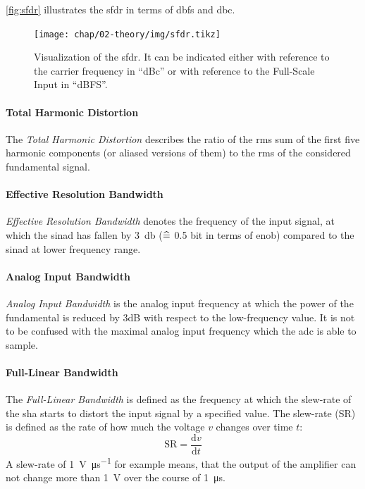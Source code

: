 \autoref{fig:sfdr} illustrates the \gls{sfdr} in terms of \gls{dbfs} and \gls{dbc}.

\begin{figure}[tbh]
	\centering
	\texttt{[image: chap/02-theory/img/sfdr.tikz]}
	\caption[SFDR definition]{Visualization of the \gls{sfdr}. It can be indicated either with reference to the carrier frequency in ``dBc'' or with reference to the Full-Scale Input in ``dBFS''. \cite{walt2009}}
	\label{fig:sfdr}
\end{figure}
\paragraph{Total Harmonic Distortion}
The \textit{Total Harmonic Distortion} describes the ratio of the \gls{rms} sum of the first five harmonic components (or aliased versions of them) to the \gls{rms} of the considered fundamental signal. \cite{Lundberg}

\paragraph{Effective Resolution Bandwidth}
\textit{Effective Resolution Bandwidth} denotes the frequency of the input signal, at which the \gls{sinad} has fallen by \SI{3}{\decibel} ($\mathrel{\widehat{=}}$ 0.5 bit in terms of \gls{enob}) compared to the \gls{sinad} at lower frequency range. \cite{Lundberg}

\paragraph{Analog Input Bandwidth}
\textit{Analog Input Bandwidth} is the analog input frequency at which the power of the fundamental is reduced by 3dB with respect to the low-frequency value. \cite{Lundberg}
It is not to be confused with the maximal analog input frequency which the \gls{adc} is able to sample.

\paragraph{Full-Linear Bandwidth}
The \textit{Full-Linear Bandwidth} is defined as the frequency at which the slew-rate of the \gls{sha} starts to distort the input signal by a specified value. \cite{Lundberg} 
The slew-rate (SR) is defined as the rate of how much the voltage $v$ changes over time $t$:
\begin{equation}
	\text{SR} = \frac{\text{d}v}{\text{d}t}
\end{equation}
A slew-rate of \SI{1}{\volt \per \micro \second} for example means, that the output of the amplifier can not change more than \SI{1}{\volt} over the course of \SI{1}{\micro \second}.\cite{2021Slew} 

